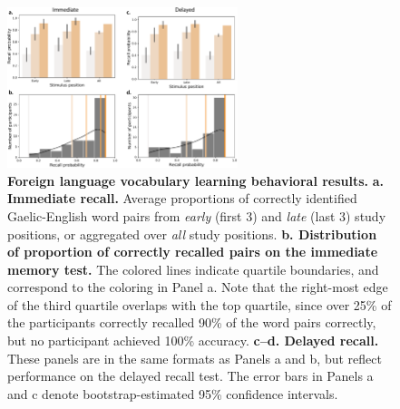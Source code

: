\documentclass[10pt]{article}
\begin{document}
\begin{figure}[p]
\centering
\includegraphics[width=0.6\textwidth]{figs/vocab_learning_behavior}
\caption{\textbf{Foreign language vocabulary learning behavioral
    results.}  \textbf{a. Immediate recall.}  Average proportions of
  correctly identified Gaelic-English word pairs from \textit{early} (first 3) and
\textit{late} (last 3) study positions, or aggregated over
\textit{all} study positions.  \textbf{b. Distribution of proportion
  of correctly recalled pairs on the immediate memory test.}  The colored
lines indicate quartile boundaries, and correspond to the coloring in
Panel a.  Note that the right-most edge of the third quartile overlaps
with the top quartile, since over 25\% of the participants correctly recalled
90\% of the word pairs correctly, but no participant achieved 100\%
accuracy.  \textbf{c--d. Delayed recall.}  These panels are in the
same formats as Panels a and b, but reflect performance on the delayed
recall test.  The error bars in Panels a and c denote
bootstrap-estimated 95\% confidence intervals.}
\label{fig:vocab_behavioral}
\end{figure}
\end{document}
